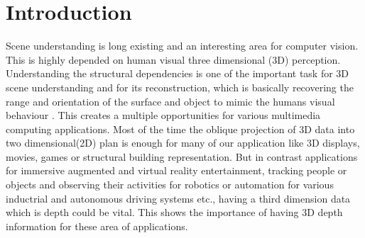 
\chapter{Introduction} %

\label{Chapter1} %


\newcommand{\keyword}[1]{\textbf{#1}}
\newcommand{\tabhead}[1]{\textbf{#1}}
\newcommand{\code}[1]{\texttt{#1}}
\newcommand{\file}[1]{\texttt{\bfseries#1}}
\newcommand{\option}[1]{\texttt{\itshape#1}}




Scene understanding is long existing and an interesting area for computer vision. This is highly depended on human visual three dimensional (3D) perception. Understanding the structural dependencies is one of the important task for 3D scene understanding and for its reconstruction, which is basically recovering the range and orientation of the surface and object to mimic the humans visual behaviour \cite{barnard1982computational}. This creates a multiple opportunities for various multimedia computing applications. Most of the time the oblique projection of 3D data into two dimensional(2D) plan is enough for many of our application like 3D displays, movies, games or structural building representation. But in contrast applications for immersive augmented and virtual reality entertainment, tracking people or objects and observing their activities for robotics or automation for various inductrial and autonomous driving systems etc., having a third dimension data which is depth could be vital. This shows the importance of having 3D depth information for these area of applications. \\

